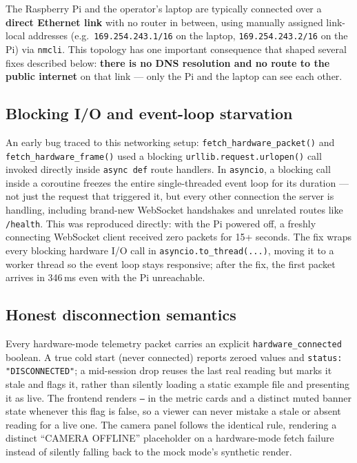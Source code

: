\documentclass[11pt]{article}
\begin{document}
The Raspberry Pi and the operator's laptop are typically connected over a \textbf{direct Ethernet link} with no router in between, using manually assigned link-local addresses (e.g.\ \texttt{169.254.243.1/16} on the laptop, \texttt{169.254.243.2/16} on the Pi) via \texttt{nmcli}. This topology has one important consequence that shaped several fixes described below: \textbf{there is no DNS resolution and no route to the public internet} on that link --- only the Pi and the laptop can see each other.

\subsection{Blocking I/O and event-loop starvation}

An early bug traced to this networking setup: \texttt{fetch\_hardware\_packet()} and \texttt{fetch\_hardware\_frame()} used a blocking \texttt{urllib.request.urlopen()} call invoked directly inside \texttt{async def} route handlers. In \texttt{asyncio}, a blocking call inside a coroutine freezes the entire single-threaded event loop for its duration --- not just the request that triggered it, but every other connection the server is handling, including brand-new WebSocket handshakes and unrelated routes like \texttt{/health}. This was reproduced directly: with the Pi powered off, a freshly connecting WebSocket client received zero packets for 15+ seconds. The fix wraps every blocking hardware I/O call in \texttt{asyncio.to\_thread(...)}, moving it to a worker thread so the event loop stays responsive; after the fix, the first packet arrives in 346\,ms even with the Pi unreachable.

\subsection{Honest disconnection semantics}

Every hardware-mode telemetry packet carries an explicit \texttt{hardware\_connected} boolean. A true cold start (never connected) reports zeroed values and \texttt{status: "DISCONNECTED"}; a mid-session drop reuses the last real reading but marks it stale and flags it, rather than silently loading a static example file and presenting it as live. The frontend renders \texttt{--} in the metric cards and a distinct muted banner state whenever this flag is false, so a viewer can never mistake a stale or absent reading for a live one. The camera panel follows the identical rule, rendering a distinct ``CAMERA OFFLINE'' placeholder on a hardware-mode fetch failure instead of silently falling back to the mock mode's synthetic render.
\end{document}
